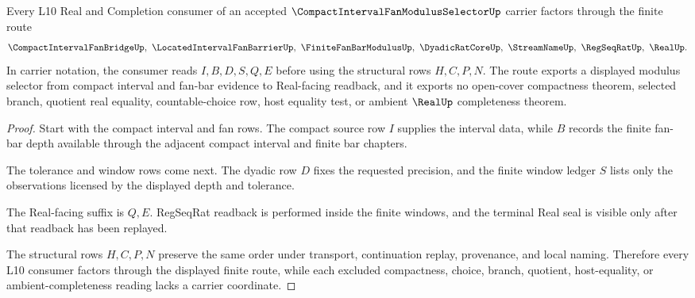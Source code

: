 \begin{theorem}
\label{thm:compact-interval-fan-modulus-selector-finite-route}
Every L10 Real and Completion consumer of an accepted $\CompactIntervalFanModulusSelectorUp$ carrier factors through the finite route
$$
\CompactIntervalFanBridgeUp,\ \LocatedIntervalFanBarrierUp,\ \FiniteFanBarModulusUp,\ \DyadicRatCoreUp,\ \StreamNameUp,\ \RegSeqRatUp,\ \RealUp .
$$
In carrier notation, the consumer reads $I,B,D,S,Q,E$ before using the structural rows $H,C,P,N$. The route exports a displayed modulus selector from compact interval and fan-bar evidence to Real-facing readback, and it exports no open-cover compactness theorem, selected branch, quotient real equality, countable-choice row, host equality test, or ambient $\RealUp$ completeness theorem.
\end{theorem}
\begin{proof}
Start with the compact interval and fan rows. The compact source row $I$ supplies the interval data, while $B$ records the finite fan-bar depth available through the adjacent compact interval and finite bar chapters.

The tolerance and window rows come next. The dyadic row $D$ fixes the requested precision, and the finite window ledger $S$ lists only the observations licensed by the displayed depth and tolerance.

The Real-facing suffix is $Q,E$. RegSeqRat readback is performed inside the finite windows, and the terminal Real seal is visible only after that readback has been replayed.

The structural rows $H,C,P,N$ preserve the same order under transport, continuation replay, provenance, and local naming. Therefore every L10 consumer factors through the displayed finite route, while each excluded compactness, choice, branch, quotient, host-equality, or ambient-completeness reading lacks a carrier coordinate.
\end{proof}



